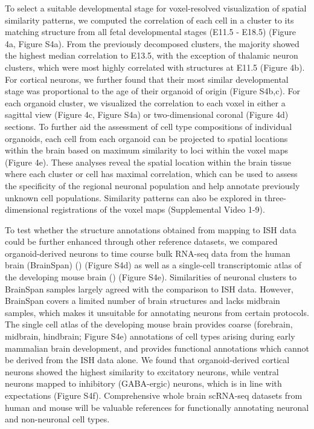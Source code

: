 To select a suitable developmental stage for voxel-resolved visualization of spatial similarity patterns, we computed the correlation of each cell in a cluster to its matching structure from all fetal developmental stages (E11.5 - E18.5) (Figure 4a, Figure S4a). From the previously decomposed clusters, the majority showed the highest median correlation to E13.5, with the exception of thalamic neuron clusters, which were most highly correlated with structures at E11.5 (Figure 4b). For cortical neurons, we further found that their most similar developmental stage was proportional to the age of their organoid of origin (Figure S4b,c). For each organoid cluster, we visualized the correlation to each voxel in either a sagittal view (Figure 4c, Figure S4a) or two-dimensional coronal (Figure 4d) sections. To further aid the assessment of cell type compositions of individual organoids, each cell from each organoid can be projected to spatial locations within the brain based on maximum similarity to loci within the voxel maps (Figure 4e). These analyses reveal the spatial location within the brain tissue where each cluster or cell has maximal correlation, which can be used to assess the specificity of the regional neuronal population and help annotate previously unknown cell populations. Similarity patterns can also be explored in three-dimensional registrations of the voxel maps (Supplemental Video 1-9). 

To test whether the structure annotations obtained from mapping to ISH data could be further enhanced through other reference datasets, we compared organoid-derived neurons to time course bulk RNA-seq data from the human brain (BrainSpan) (\cite{thompson_high-resolution_2014}) (Figure S4d) as well as a single-cell transcriptomic atlas of the developing mouse brain (\cite{la_manno_molecular_2021}) (Figure S4e). Similarities of neuronal clusters to BrainSpan samples largely agreed with the comparison to ISH data. However, BrainSpan covers a limited number of brain structures and lacks midbrain samples, which makes it unsuitable for annotating neurons from certain protocols. The single cell atlas of the developing mouse brain provides coarse (forebrain, midbrain, hindbrain; Figure S4e) annotations of cell types arising during early mammalian brain development, and provides functional annotations which cannot be derived from the ISH data alone. We found that organoid-derived cortical neurons showed the highest similarity to excitatory neurons, while ventral neurons mapped to inhibitory (GABA-ergic) neurons, which is in line with expectations (Figure S4f). Comprehensive whole brain scRNA-seq datasets from human and mouse will be valuable references for functionally annotating neuronal and non-neuronal cell types.

